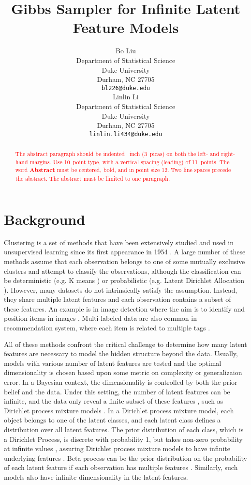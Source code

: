 \documentclass{article}
\title{Gibbs Sampler for Infinite Latent Feature Models}
\author{%
  Bo Liu \\
  Department of Statistical Science\\
  Duke University\\
  Durham, NC 27705 \\
  \texttt{bl226@duke.edu} \\
  \And
  Linlin Li \\
  Department of Statistical Science\\
  Duke University\\
  Durham, NC 27705 \\
  \texttt{linlin.li434@duke.edu} \\
}
\begin{document}
\maketitle

\begin{abstract}
  \textcolor{red}{The abstract paragraph should be indented ~inch (3~picas) on
  both the left- and right-hand margins. Use 10~point type, with a vertical
  spacing (leading) of 11~points.  The word \textbf{Abstract} must be centered,
  bold, and in point size 12. Two line spaces precede the abstract. The abstract
  must be limited to one paragraph.}
\end{abstract}

\section{Background}

Clustering is a set of methods that have been extensively studied and used in unsupervised learning since its first appearance in 1954 \citep{caron2018deep}. A large number of these methods assume that each observation belongs to one of some mutually exclusive clusters and attempt to classify the observations, although the classification can be deterministic (e.g. K means \citep{steinhaus1956division, lloyd1982least}) or probabilistic (e.g. Latent Dirichlet Allocation \citep{blei2003latent}). However, many datasets do not intrinsically satisfy the assumption. Instead, they share multiple latent features and each observation contains a subset of these features. An example is in image detection where the aim is to identify and position items in images \citep{zhang2018multilabel}. Multi-labeled data are also common in recommendation system, where each item is related to multiple tags \citep{zheng2014context}.

All of these methods confront the critical challenge to determine how many latent features are necessary to model the hidden structure beyond the data. Usually, models with various number of latent features are tested and the optimal dimensionality is chosen based upon some metric on complexity or generalizaion error. In a Bayesian context, the dimensionality is controlled by both the prior belief and the data. Under this setting, the number of latent features can be infinite, and the data only reveal a finite subset of these features \citep{rasmussen2001occam}, such as Dirichlet process mixture models \citep{antoniak1974mixtures}. In a Dirichlet process mixture model, each object belongs to one of the latent classes, and each latent class defines a distribution over all latent features. The prior distribution of each class, which is a Dirichlet Process, is discrete with probability 1, but takes non-zero probability at infinite values \citep{teh2010dirichlet}, assuring Dirichlet process mixture models to have infinite underlying features \citep{rasmussen2000infinite}. Beta process can be the prior distribution on the probability of each latent feature if each observation has multiple features \citep{JMLR:v12:griffiths11a}. Similarly, such models also have infinite dimensionality in the latent features.
\end{document}
